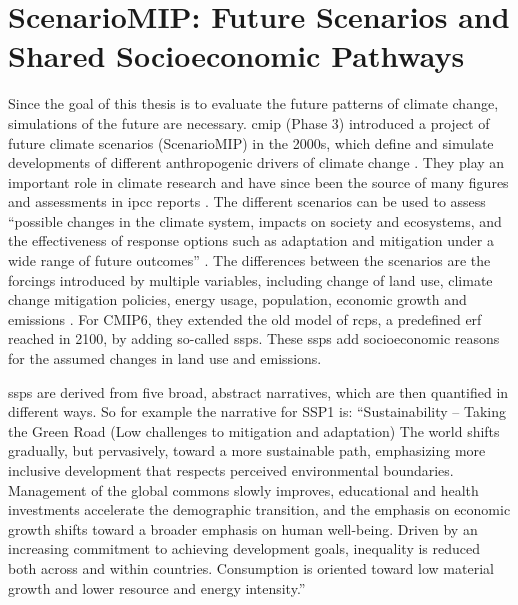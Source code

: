 \section{ScenarioMIP: Future Scenarios and Shared Socioeconomic Pathways}

\label{sec:scenariomip}

Since the goal of this thesis is to evaluate the future patterns of climate change, simulations of the future are necessary. 
\ac{cmip} (Phase 3) introduced a project of future climate scenarios (ScenarioMIP) in the 2000s, which define and simulate developments of different anthropogenic drivers of climate change \cite{oneill_scenario_2016}. 
They play an important role in climate research and have since been the source of many figures and assessments in \ac{ipcc} reports \cite{touzepeiffer_coupled_2020}. 
The different scenarios can be used to assess \enquote{possible changes in the climate system, impacts on society and ecosystems, and the effectiveness of response options such as adaptation and mitigation under a wide range of future outcomes} \cite{oneill_scenario_2016}.
The differences between the scenarios are the forcings introduced by multiple variables, including change of land use, climate change mitigation policies, energy usage, population, economic growth and emissions \cite{riahi_shared_2017}.   
For CMIP6, they extended the old model of \acp{rcp}, a predefined \ac{erf} reached in 2100, by adding so-called \acp{ssp}. 
These \acp{ssp} add socioeconomic reasons for the assumed changes in land use and emissions. 


\acp{ssp} are derived from five broad, abstract narratives, which are then quantified in different ways. 
So for example the narrative for SSP1 is: 
  \enquote{Sustainability – Taking the Green Road (Low challenges to mitigation and adaptation) The world shifts gradually, but pervasively, toward a more sustainable path, emphasizing more inclusive development that respects perceived environmental boundaries. Management of the global commons slowly improves, educational and health investments accelerate the demographic transition, and the emphasis on economic growth shifts toward a broader emphasis on human well-being. Driven by an increasing commitment to achieving development goals, inequality is reduced both across and within countries. Consumption is oriented toward low material growth and lower resource and energy intensity.} \cite{riahi_shared_2017}

